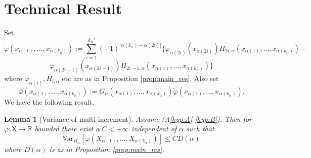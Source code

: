 \documentclass[english]{article}
\newtheorem{lem}{Lemma}[section]
\begin{document}
\appendix

\section{Technical Result}

Set 
$$
\tilde{\varphi}(x_{\alpha(1)},\dots,x_{\alpha(k_{\alpha})})  := \sum_{i=1}^{k_{\alpha}'} (-1)^{|\alpha(k_{\alpha})-\alpha(2i)|}\Big\{
\varphi_{\alpha(2i)}(x_{\alpha(2i)}) H_{2i,\alpha}(x_{\alpha(1)},\dots,x_{\alpha(k_{\alpha})}) -
$$
$$
\varphi_{\alpha(2i-1)}(x_{\alpha(2i-1)}) H_{2i-1,\alpha}(x_{\alpha(1)},\dots,x_{\alpha(k_{\alpha})})
\Big\}
$$
where $\varphi_{\alpha(i)}, H_{i,\alpha}$ etc are as in Proposition \ref{prop:main_res}. Also
set 
$$
\bar{\varphi}(x_{\alpha(1)},\dots,x_{\alpha(k_{\alpha})})  :=
G_{\alpha}(x_{\alpha(1)},\dots,x_{\alpha(k_{\alpha})})
\tilde{\varphi}(x_{\alpha(1)},\dots,x_{\alpha(k_{\alpha})}).
$$
We have the following result.

\begin{lem}[Variance of multi-increment]\label{lem:tech_res}
Assume (A\ref{hyp:A}-\ref{hyp:B}). Then for $\varphi:\mathsf{X}\rightarrow\mathbb{R}$ bounded
there exist a $C<+\infty$ independent of $\alpha$ such that
$$
\mathbb{V}\textrm{ar}_{\Pi_{\alpha}}[\tilde{\varphi}(X_{\alpha(1)},\dots,X_{\alpha(k_{\alpha})})]
\leq C D(\alpha)
$$
where $D(\alpha)$ is as in Proposition \ref{prop:main_res}.
\end{lem}
\end{document}

